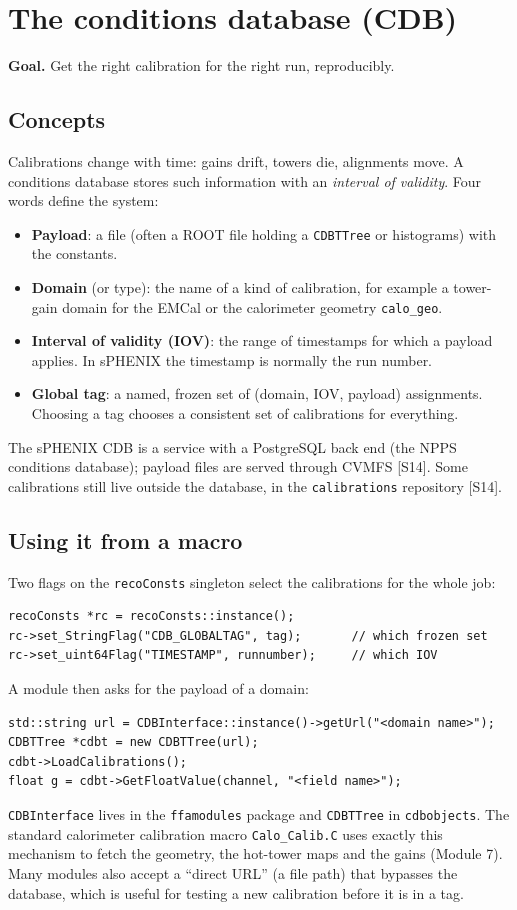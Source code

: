 \documentclass[11pt,letterpaper]{article}
\newcommand{\goal}[1]{\par\noindent\textbf{Goal.} #1\par}
\begin{document}
\section{The conditions database (CDB)}\label{sec:cdb}
\goal{Get the right calibration for the right run, reproducibly.}

\subsection{Concepts}
Calibrations change with time: gains drift, towers die, alignments move. A conditions database stores such information with an \emph{interval of validity}.
Four words define the system:
\begin{itemize}
\item \textbf{Payload}: a file (often a ROOT file holding a \texttt{CDBTTree} or histograms) with the constants.
\item \textbf{Domain} (or type): the name of a kind of calibration, for example a tower-gain domain for the EMCal or the calorimeter geometry \texttt{calo\_geo}.
\item \textbf{Interval of validity (IOV)}: the range of timestamps for which a payload applies. In sPHENIX the timestamp is normally the run number.
\item \textbf{Global tag}: a named, frozen set of (domain, IOV, payload) assignments. Choosing a tag chooses a consistent set of calibrations for everything.
\end{itemize}
The sPHENIX CDB is a service with a PostgreSQL back end (the NPPS conditions database); payload files are served through CVMFS [S14].
Some calibrations still live outside the database, in the \texttt{calibrations} repository [S14].

\subsection{Using it from a macro}
Two flags on the \texttt{recoConsts} singleton select the calibrations for the whole job:
{\footnotesize\begin{verbatim}
recoConsts *rc = recoConsts::instance();
rc->set_StringFlag("CDB_GLOBALTAG", tag);       // which frozen set
rc->set_uint64Flag("TIMESTAMP", runnumber);     // which IOV
\end{verbatim}}
A module then asks for the payload of a domain:
{\footnotesize\begin{verbatim}
std::string url = CDBInterface::instance()->getUrl("<domain name>");
CDBTTree *cdbt = new CDBTTree(url);
cdbt->LoadCalibrations();
float g = cdbt->GetFloatValue(channel, "<field name>");
\end{verbatim}}
\texttt{CDBInterface} lives in the \texttt{ffamodules} package and \texttt{CDBTTree} in \texttt{cdbobjects}.
The standard calorimeter calibration macro \texttt{Calo\_Calib.C} uses exactly this mechanism to fetch the geometry, the hot-tower maps and the gains (Module 7).
Many modules also accept a ``direct URL'' (a file path) that bypasses the database, which is useful for testing a new calibration before it is in a tag.
\end{document}
